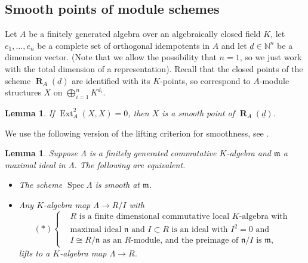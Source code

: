 \documentclass[11pt,a4paper]{amsart}
\theoremstyle{plain}
\newtheorem{lem}[thm]{Lemma}
\theoremstyle{definition}
\begin{document}
\subsection*{Smooth points of module schemes}
Let $A$ be a finitely generated algebra over an algebraically closed field $K$,
let $e_1,\dots,e_n$ be a complete set of orthogonal idempotents in $A$ and let
${\underline{d}}\in{\mathbb{N}}^n$ be a dimension vector.
(Note that we allow the possibility that $n=1$, so we just work with the total dimension of a representation).
Recall that the closed points of the scheme ${\operatorname{\mathbf{R}}_A(\underline{d})}$ are identified
with its $K$-points, so correspond to $A$-module structures $X$ on $\bigoplus_{i=1}^n K^{d_i}$. 

\begin{lem} 
\label{Ext2smooth}
If $\operatorname{Ext}^2_A(X,X)=0$, then $X$ is a smooth point of ${\operatorname{\mathbf{R}}_A(\underline{d})}$.
\end{lem}

We use the following version of the lifting criterion for smoothness, see \cite[Tag 02HW]{stacks-project}. 

\begin{lem}
Suppose $\Lambda$ is a finitely generated commutative $K$-algebra and ${\mathfrak{m}}$ a maximal ideal in $\Lambda$.
The following are equivalent.
\begin{itemize}
\item[(1)] The scheme $\operatorname{Spec} \Lambda$ is smooth at ${\mathfrak{m}}$.  
\item[(2)] Any $K$-algebra map $\Lambda\to R/I$ with 
\[
(*) \left\{
\begin{aligned}
&\text{$R$ is a finite dimensional commutative local $K$-algebra with}
\\[-4pt]
&\text{maximal ideal ${\mathfrak{n}}$ and $I\subset R$ is an ideal with $I^2=0$ and }
\\[-2pt]
&\text{$I\cong R/{\mathfrak{n}}$ as an $R$-module, and the preimage of ${\mathfrak{n}}/I$ is ${\mathfrak{m}}$,}
\end{aligned}
\right.
\] 
lifts to a $K$-algebra map $\Lambda\to R$. 
\end{itemize}
\end{lem}
\end{document}
